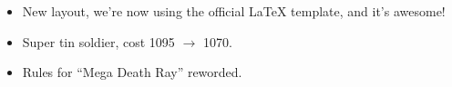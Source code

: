 



\subtitle{Example Changelog -- May update}

\begin{itemize}
\item New layout, we're now using the official LaTeX template, and it's awesome!
\item Super tin soldier, cost 1095 $\rightarrow$ 1070.
\item Rules for \enquote{Mega Death Ray} reworded.
\end{itemize}



